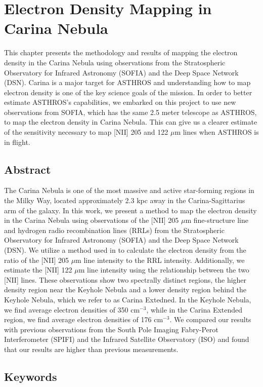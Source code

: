 \chapter[Electron Density Mapping in Carina Nebula]{Electron Density Mapping in Carina Nebula}
\label{ch:carina}
This chapter presents the methodology and results of mapping the electron density in the Carina Nebula using observations from the Stratospheric Observatory for Infrared Astronomy (SOFIA) and the Deep Space Network (DSN).
Carina is a major target for ASTHROS and understanding how to map electron density is one of the key science goals of the mission.
In order to better estimate ASTHROS's capabilities, we embarked on this project to use new observations from SOFIA, which has the same 2.5 meter telescope as ASTHROS, to map the electron density in Carina Nebula.
This can give us a clearer estimate of the sensitivity necessary to map [NII] 205 and 122 $\mu$m lines when ASTHROS is in flight. 

\section{Abstract}
The Carina Nebula is one of the most massive and active star-forming regions in the Milky Way, located approximately 2.3 kpc away in the Carina-Sagittarius arm of the galaxy.
In this work, we present a method to map the electron density in the Carina Nebula using observations of the [NII] 205 $\mu$m fine-structure line and hydrogen radio recombination lines (RRLs) from the Stratospheric Observatory for Infrared Astronomy (SOFIA) and the Deep Space Network (DSN).
We utilize a method used in \cite{pineda2019electron} to calculate the electron density from the ratio of the [NII] 205 $\mu$m line intensity to the RRL intensity.
Additionally, we estimate the [NII] 122 $\mu$m line intensity using the relationship between the two [NII] lines.
These observations show two spectrally distinct regions, the higher density region near the Keyhole Nebula and a lower density region behind the Keyhole Nebula, which we refer to as Carina Extedned.
In the Keyhole Nebula, we find average electron densities of 350 cm$^{-3}$, while in the Carina Extended region, we find average electron densities of 176 cm$^{-3}$.
We compared our results with previous observations from the South Pole Imaging Fabry-Perot Interferometer (SPIFI) and the Infrared Satellite Observatory (ISO) and found that our results are higher than previous measurements.
\section{Keywords}

